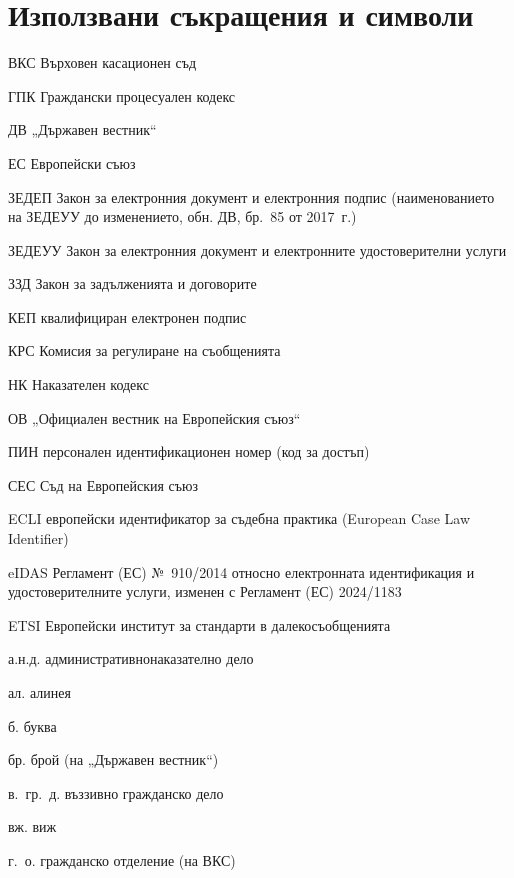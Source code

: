 \section*{Използвани съкращения и символи}
\label{sec:sakrashteniya}

{\small{}
\begin{multicols}{2}
\raggedright{}
\begin{abbrlist}
\item[ВКС] Върховен касационен съд
\item[ГПК] Граждански процесуален кодекс
\item[ДВ] „Държавен вестник“
\item[ЕС] Европейски съюз
\item[ЗЕДЕП] Закон за електронния документ и електронния подпис (наименованието на
  ЗЕДЕУУ до изменението, обн. ДВ, бр.~85 от 2017~г.)
\item[ЗЕДЕУУ] Закон за електронния документ и електронните удостоверителни услуги
\item[ЗЗД] Закон за задълженията и договорите
\item[КЕП] квалифициран електронен подпис
\item[КРС] Комисия за регулиране на съобщенията
\item[НК] Наказателен кодекс
\item[ОВ] „Официален вестник на Европейския съюз“
\item[ПИН] персонален идентификационен номер (код за достъп)
\item[СЕС] Съд на Европейския съюз
\item[ECLI] европейски идентификатор за съдебна практика (European Case Law Identifier)
\item[eIDAS] Регламент (ЕС) №~910/2014 относно електронната идентификация и
  удостоверителните услуги, изменен с Регламент (ЕС) 2024/1183
\item[ETSI] Европейски институт за стандарти в далекосъобщенията
\item[а.н.д.] административнонаказателно дело
\item[ал.] алинея
\item[б.] буква
\item[бр.] брой (на „Държавен вестник“)
\item[в.~гр.~д.] въззивно гражданско дело
\item[вж.] виж
\item[г.~о.] гражданско отделение (на ВКС)

\end{abbrlist}
\end{multicols}}
